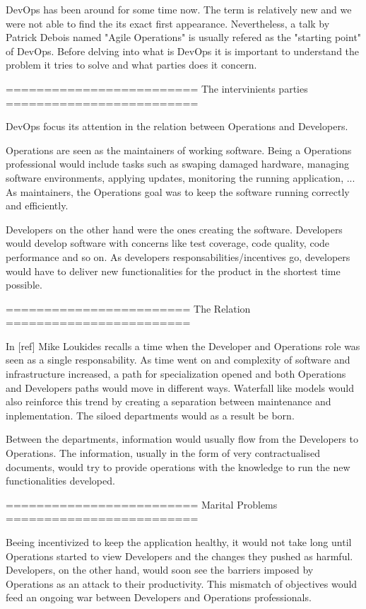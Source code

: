 DevOps has been around for some time now. 
The term is relatively new and we were not able to find the its exact first appearance. Nevertheless, a talk by Patrick Debois named "Agile Operations" is usually refered as the "starting point" of DevOps.
Before delving into what is DevOps it is important to understand the problem it tries to solve and what parties does it concern.

=========================
The intervinients parties
=========================

DevOps focus its attention in the relation between Operations and Developers.

Operations are seen as the maintainers of working software. Being a Operations professional would include tasks such as swaping damaged hardware, managing software environments, applying updates, monitoring the running application, ... As maintainers, the Operations goal was to keep the software running correctly and efficiently.

Developers on the other hand were the ones creating the software. Developers would develop software with concerns like test coverage, code quality, code performance and so on. As developers responsabilities/incentives go, developers would have to deliver new functionalities for the product in the shortest time possible.


========================
The Relation
========================

In [ref] Mike Loukides recalls a time when the Developer and Operations role was seen as a single responsability. As time went on and complexity of software and infrastructure increased, a path for specialization opened and both Operations and Developers paths would move in different ways. Waterfall like models would also reinforce this trend by creating a separation between maintenance and inplementation. The siloed departments would as a result be born. 

Between the departments, information would usually flow from the Developers to Operations. The information, usually in the form of very contractualised documents, would try to provide operations with the knowledge to run the new functionalities developed. 


=========================
Marital Problems
=========================

Beeing incentivized to keep the application healthy, it would not take long until Operations started to view Developers and the changes they pushed as harmful. Developers, on the other hand, would soon see the barriers imposed by Operations as an attack to their productivity. This mismatch of objectives would feed an ongoing war between Developers and Operations professionals.

